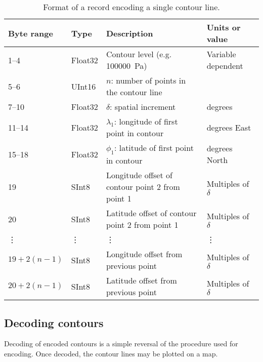 \documentclass[12pt,a4paper]{article}
\begin{document}
\begin{table*}
\centering
\begin{tabular}{llll} \hline
Byte range     & Type      & Description                                      & Units or value                                         \\ \hline
1--4           & Float32   & Contour level (e.g. \SI{100000}{\Pa})            & Variable dependent                                     \\
5--6           & UInt16    & $n$: number of points in the contour line        &                                                        \\
7--10          & Float32   & $\delta$: spatial increment                      & degrees                                                \\
11--14         & Float32   & $\lambda_1$: longitude of first point in contour & degrees East                                           \\
15--18         & Float32   & $\phi_1$: latitude of first point in contour     & degrees North                                          \\
19             & SInt8     & Longitude offset of contour point 2 from point 1 & Multiples of $\delta$												\\
20             & SInt8     & Latitude offset of contour point 2 from point 1  & Multiples of $\delta$												\\
\vdots         & \vdots    & \vdots                                           & \vdots                                                 \\
$19 + 2(n-1)$  & SInt8     & Longitude offset from previous point             & Multiples of $\delta$												\\
$20 + 2(n-1)$  & SInt8     & Latitude offset from previous point              & Multiples of $\delta$												\\ \hline
\end{tabular}
\caption{\label{tab:contour_record}Format of a record encoding a single contour
line.}
\end{table*}

\subsection*{Decoding contours}
\label{sec:decoding}

Decoding of encoded contours is a simple reversal of the procedure used for
encoding. Once decoded, the contour lines may be plotted on a map.
\end{document}
